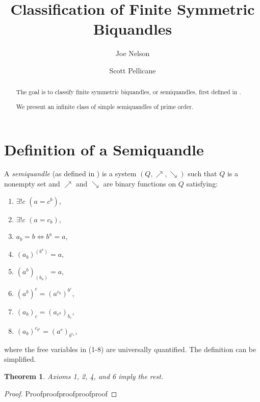 \documentclass{amsart}
\newtheorem{thm}{Theorem}[section]
\theoremstyle{definition}
\numberwithin{equation}{section}
\begin{document}
\title{Classification of Finite Symmetric Biquandles}

\author{Joe Nelson}
\author{Scott Pellicane}

\begin{abstract}
The goal is to classify finite symmetric biquandles, or semiquandles,
first defined in \cite{aH10}.

We present an infinite class of simple semiquandles of prime order.
\end{abstract}

\maketitle


\section{Definition of a Semiquandle}

A \emph{semiquandle} (as defined in \cite{aH10}) is a system
$(Q,\nearrow,\searrow)$ such that $Q$ is a nonempty set and $\nearrow$
and $\searrow$ are binary functions on $Q$ satisfying:

\begin{enumerate}
\item $\exists!{c}$ $(a = c^b)$,
\item $\exists!{c}$ $(a = c_b)$,
\item $a_b = b \Leftrightarrow b^a = a$,
\item $(a_b)^{(b^a)} = a$,
\item $(a^b)_{(b_a)} = a$,
\item $(a^b)^c = (a^{c_b})^{b^c}$,
\item $(a_b)_c = (a_{c^b})_{b_c}$,
\item $(a_b)^{c_{b^a}} = (a^c)_{b^{c_a}}$,
\end{enumerate}
where the free variables in (1-8) are universally quantified. The
definition can be simplified.

\begin{thm}
Axioms 1, 2, 4, and 6 imply the rest.
\end{thm}

\begin{proof}
Proofproofproofproofproof
\end{proof}
\end{document}
